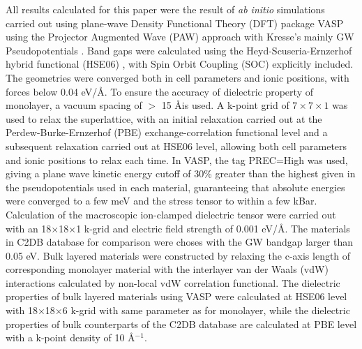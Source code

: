 \documentclass[journal=ancac3,manuscript=article,email=true,hyperref=true,keywords=false]{achemso}
\begin{document}
All results calculated for this paper were the result of \emph{ab
  initio} simulations carried out using plane-wave Density Functional
Theory (DFT) package VASP
\cite{Kresse_1993,Kresse_1996_1,Kresse_1996_2} using the Projector
Augmented Wave (PAW) approach with Kresse’s mainly GW
Pseudopotentials \cite{Kresse_1999_pseudopotentials}. Band gaps were
calculated using the Heyd-Scuseria-Ernzerhof hybrid functional (HSE06)
\cite{Heyd_2003,HSE_2006}, with Spin Orbit Coupling (SOC) explicitly
included. The geometries were converged both in cell parameters and
ionic positions, with forces below 0.04 eV/\AA. To ensure the accuracy
of dielectric property of monolayer, a vacuum spacing of $>$ 15 \AA is
used. A k-point grid of \(7\times7\times1\) was used to relax the
superlattice, with an initial relaxation carried out at the
Perdew-Burke-Ernzerhof
(PBE)\cite{Perdew_1996,Ernzerhof_1999,Paier_2005_PBE}
exchange-correlation functional level and a subsequent relaxation
carried out at HSE06 level, allowing both cell parameters and ionic
positions to relax each time. In VASP, the tag PREC=High was used,
giving a plane wave kinetic energy cutoff of 30\% greater than the
highest given in the pseudopotentials used in each material,
guaranteeing that absolute energies were converged to a few meV and
the stress tensor to within a few kBar.  Calculation of the
macroscopic ion-clamped dielectric tensor were carried out with an
18$\times$18$\times$1 k-grid and electric field strength of 0.001
eV/\AA. The materials in C2DB database for comparison were choses with
the GW bandgap larger than 0.05 eV. Bulk layered materials were
constructed by relaxing the c-axis length of corresponding monolayer
material with the interlayer van der Waals (vdW) interactions
calculated by non-local vdW correlation
functional\cite{Lee_2010_vdFD2}.  The dielectric properties of bulk
layered materials using VASP were calculated at HSE06 level with
18$\times$18$\times$6 k-grid with same parameter as for monolayer,
while the dielectric properties of bulk counterparts of the C2DB
database are calculated at PBE level with a k-point density of 10
\AA$^{-1}$.




\end{document}
